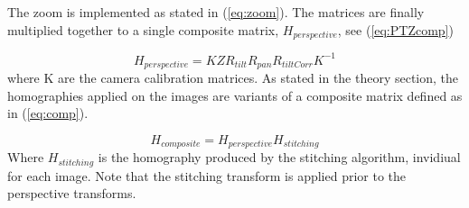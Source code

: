 	The zoom is implemented as stated in (\ref{eq:zoom}).
	The matrices are finally multiplied together to a single composite matrix, $H_{perspective}$, see (\ref{eq:PTZcomp})

	\begin{equation}
		H_{perspective}=KZR_{tilt}R_{pan}R_{tiltCorr}K^{-1}
		\label{eq:PTZcomp}
	\end{equation}
	where K are the camera calibration matrices.
	As stated in the theory section, the homographies applied on the images are variants of a composite matrix defined as in (\ref{eq:comp}).

	\begin{equation}
		H_{composite}=H_{perspective}H_{stitching}
		\label{eq:comp}
	\end{equation}
	Where $H_{stitching}$ is the homography produced by the stitching algorithm, invidiual for each image. Note that the stitching transform is applied prior to the perspective transforms.
